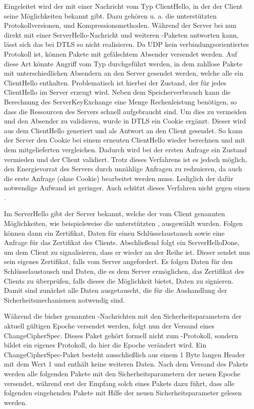Eingeleitet wird der  mit einer Nachricht vom Typ ClientHello, in der der Client seine Möglichkeiten bekannt gibt. Dazu gehören u. a. die unterstützten
Protokollversionen,  und Kompressionsmethoden. Während der Server bei  nun direkt mit einer ServerHello-Nachricht und weiteren
-Paketen antworten kann, lässt sich das bei DTLS so nicht realisieren. Da UDP kein verbindungsorientiertes Protokoll ist, können Pakete mit gefälschtem
Absender versendet werden. Auf diese Art könnte Angriff vom Typ  durchgeführt werden, in dem zahllose Pakete mit unterschiedlichen Absendern an den Server
gesendet werden, welche alle ein ClientHello enthalten. Problematisch ist hierbei der Zustand, der für jedes ClientHello im Server erzeugt wird. Neben dem
Speicherverbrauch kann die Berechnung des ServerKeyExchange eine Menge Rechenleistung benötigen, so dass die Ressourcen des Servers schnell aufgebraucht sind.
Um dies zu vermeiden und den Absender zu validieren, wurde in DTLS ein Cookie ergänzt. Dieser wird aus dem ClientHello generiert und als Antwort an den Client
gesendet. So kann der Server den Cookie bei einem erneuten ClientHello wieder berechnen und mit dem mitgelieferten vergleichen. Dadurch wird bei der ersten Anfrage
ein Zustand vermieden und der Client validiert. Trotz dieses Verfahrens ist es jedoch möglich, den Energievorrat des Servers durch unzählige Anfragen zu redzuieren,
da auch die erste Anfrage (ohne Cookie) bearbeitet werden muss. Lediglich der dafür notwendige Aufwand ist geringer. Auch schützt dieses Verfahren nicht gegen
einen .

Im ServerHello gibt der Server bekannt, welche der vom Client genannten Möglichkeiten, wie beispielsweise die unterstützten , ausgewählt wurden.
Folgen können dann ein Zertifikat, Daten für einen Schlüsselaustausch sowie eine Anfrage für das Zertifikat des Clients. Abschließend folgt ein ServerHelloDone, um
dem Client zu signalisieren, dass er wieder an der Reihe ist. Dieser sendet nun sein eigenes Zertifikat, falls vom Server angefordert. Es folgen Daten für den
Schlüsselaustausch und Daten, die es dem Server ermöglichen, das Zertifikat des Clients zu überprüfen, falls dieses die Möglichkeit bietet, Daten zu signieren.
Damit sind zunächst alle Daten ausgetauscht, die für die Aushandlung der Sicherheitsmechanismen notwendig sind.

Während die bisher genannten -Nachrichten mit den Sicherheitsparametern der aktuell gültigen Epoche versendet werden, folgt nun der Versand eines
ChangeCipherSpec. Dieses Paket gehört formell nicht zum -Protokoll, sondern bildet ein eigenes Protokoll, da hier die Epoche verändert wird.
Ein ChangeCipherSpec-Paket besteht ausschließlich aus einem 1 Byte langen Header mit dem Wert 1 und enthält keine weiteren Daten.
Nach dem Versand des Pakets werden alle folgenden Pakete mit den Sicherheitsparametern der neuen Epoche versendet, während erst der Empfang solch eines
Pakets dazu führt, dass alle folgenden eingehenden Pakete mit Hilfe der neuen Sicherheitsparameter gelesen werden.

